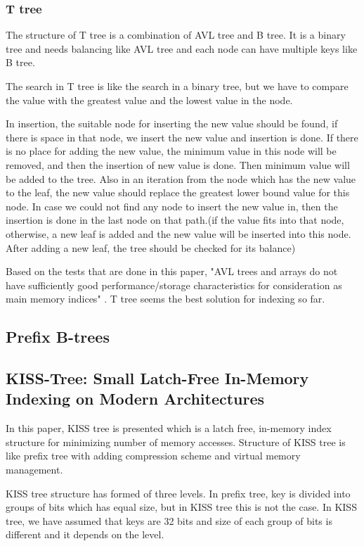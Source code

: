 \documentclass{report}
\begin{document}
\subsubsection{T tree}

The structure of T tree is a combination of AVL tree and B tree. It is a binary tree and needs balancing like AVL tree and each node can have multiple keys like B tree.

The search in T tree is like the search in a binary tree, but we have to compare the value with the greatest value and the lowest value in the node.

 In insertion, the suitable node for inserting the new value should be found, if there is space in that node, we insert the new value and insertion is done. If there is no place for adding the new value, the minimum value in this node will be removed, and then the insertion of new value is done. Then minimum value will be added to the tree. Also in an iteration from the node which has the new value to the leaf, the new value should replace the greatest lower bound value for this node. In case we could not find any node to insert the new value in, then the insertion is done in the last node on that path.(if the value fits into that node, otherwise, a new leaf is added and the new value will be inserted into this node. After adding a new leaf, the tree should be checked for its balance)
 
Based on the tests that are done in this paper, "AVL trees and arrays do not have sufficiently good performance/storage characteristics for consideration as main memory indices" \cite{leca}. T tree seems the best solution for indexing so far. 

\subsection{Prefix B-trees \cite{R.Bayer} }


\subsection{KISS-Tree: Small Latch-Free In-Memory Indexing on Modern Architectures \cite{Kissinger} }

In this paper, KISS tree is presented which is a latch free, in-memory index structure for minimizing number of memory accesses. Structure of KISS tree is like prefix tree with adding compression scheme and virtual memory management.

KISS tree structure has formed of three levels. In prefix tree, key is divided into groups of bits which has equal size, but in KISS tree this is not the case. In KISS tree, we have assumed that keys are 32 bits and size of each group of bits is different and it depends on the level.
\end{document}
